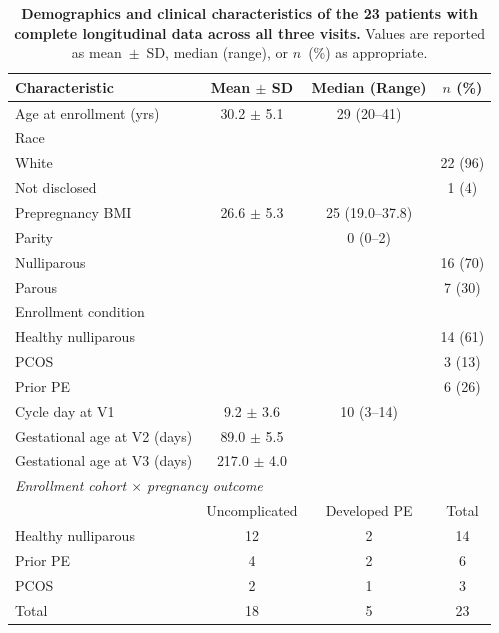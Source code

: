 
\begin{table}[p]
\centering
\caption{\textbf{Demographics and clinical characteristics of the 23 patients
with complete longitudinal data across all three visits.} Values are reported as
mean~$\pm$~SD, median (range), or $n$~(\%) as appropriate.}
\label{tab:demographics}
\begin{tabular}{lccc}
\toprule
Characteristic & Mean $\pm$ SD & Median (Range) & $n$ (\%) \\
\midrule
Age at enrollment (yrs) & 30.2 $\pm$ 5.1 & 29 (20--41) & \\
\addlinespace
Race & & & \\
\quad White & & & 22 (96) \\
\quad Not disclosed & & & 1 (4) \\
\addlinespace
Prepregnancy BMI & 26.6 $\pm$ 5.3 & 25 (19.0--37.8) & \\
\addlinespace
Parity & & 0 (0--2) & \\
\quad Nulliparous & & & 16 (70) \\
\quad Parous & & & 7 (30) \\
\addlinespace
Enrollment condition & & & \\
\quad Healthy nulliparous & & & 14 (61) \\
\quad PCOS & & & 3 (13) \\
\quad Prior PE & & & 6 (26) \\
\addlinespace
Cycle day at V1 & 9.2 $\pm$ 3.6 & 10 (3--14) & \\
\addlinespace
Gestational age at V2 (days) & 89.0 $\pm$ 5.5 & & \\
Gestational age at V3 (days) & 217.0 $\pm$ 4.0 & & \\
\midrule
\multicolumn{4}{l}{\textit{Enrollment cohort $\times$ pregnancy outcome}} \\
\midrule
 & Uncomplicated & Developed PE & Total \\
\midrule
Healthy nulliparous & 12 & 2 & 14 \\
Prior PE & 4 & 2 & 6 \\
PCOS & 2 & 1 & 3 \\
\midrule
Total & 18 & 5 & 23 \\
\bottomrule
\end{tabular}
\end{table}


